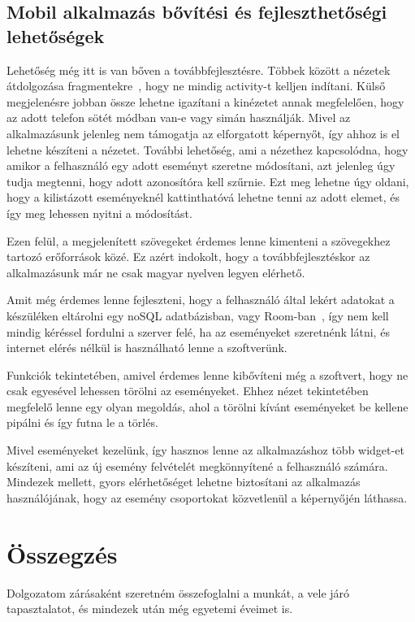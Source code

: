 \documentclass[
]{thesis-ekf}
\theoremstyle{definition}
\theoremstyle{remark}
\begin{document}
	\section{Mobil alkalmazás bővítési és fejleszthetőségi lehetőségek}
	Lehetőség még itt is van bőven a továbbfejlesztésre. Többek között a nézetek átdolgozása fragmentekre~\cite{android_fragment}, hogy ne mindig activity-t kelljen indítani. Külső megjelenésre jobban össze lehetne igazítani a kinézetet annak megfelelően, hogy az adott telefon sötét módban van-e vagy simán használják. Mivel az alkalmazásunk jelenleg nem támogatja az elforgatott képernyőt, így ahhoz is el lehetne készíteni a nézetet. További lehetőség, ami a nézethez kapcsolódna, hogy amikor a felhasználó egy adott eseményt szeretne módosítani, azt jelenleg úgy tudja megtenni, hogy adott azonosítóra kell szűrnie. Ezt meg lehetne úgy oldani, hogy a kilistázott eseményeknél kattinthatóvá lehetne tenni az adott elemet, és így meg lehessen nyitni a módosítást. 
	
	Ezen felül, a megjelenített szövegeket érdemes lenne kimenteni a szövegekhez tartozó erőforrások közé. Ez azért indokolt, hogy a továbbfejlesztéskor az alkalmazásunk már ne csak magyar nyelven legyen elérhető. 
	
	Amit még érdemes lenne fejleszteni, hogy a felhasználó által lekért adatokat a készüléken eltárolni egy noSQL adatbázisban, vagy Room-ban~\cite{android_room}, így nem kell mindig kéréssel fordulni a szerver felé, ha az eseményeket szeretnénk látni, és internet elérés nélkül is használható lenne a szoftverünk. 
	
	Funkciók tekintetében, amivel érdemes lenne kibővíteni még a szoftvert, hogy ne csak egyesével lehessen törölni az eseményeket. Ehhez nézet tekintetében megfelelő lenne egy olyan megoldás, ahol a törölni kívánt eseményeket be kellene pipálni és így futna le a törlés. 
	
	Mivel eseményeket kezelünk, így hasznos lenne az alkalmazáshoz több widget-et készíteni, ami az új esemény felvételét megkönnyítené a felhasználó számára. Mindezek mellett, gyors elérhetőséget lehetne biztosítani az alkalmazás használójának, hogy az esemény csoportokat közvetlenül a képernyőjén láthassa. 
	
	\chapter{Összegzés}
	Dolgozatom zárásaként szeretném összefoglalni a munkát, a  vele járó tapasztalatot, és mindezek után még egyetemi éveimet is. 
	
\end{document}
